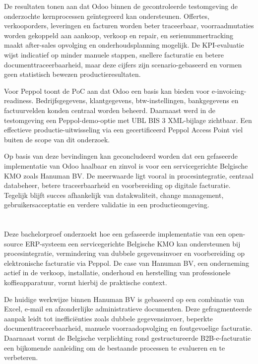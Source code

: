 {De resultaten tonen aan dat Odoo binnen de gecontroleerde testomgeving de onderzochte kernprocessen geïntegreerd kan ondersteunen. Offertes, verkooporders, leveringen en facturen worden beter traceerbaar, voorraadmutaties worden gekoppeld aan aankoop, verkoop en repair, en serienummertracking maakt after-sales opvolging en onderhoudsplanning mogelijk. De KPI-evaluatie wijst indicatief op minder manuele stappen, snellere facturatie en betere documenttraceerbaarheid, maar deze cijfers zijn scenario-gebaseerd en vormen geen statistisch bewezen productieresultaten.

Voor Peppol toont de PoC aan dat Odoo een basis kan bieden voor e-invoicing-readiness. Bedrijfsgegevens, klantgegevens, btw-instellingen, bankgegevens en factuurvelden konden centraal worden beheerd. Daarnaast werd in de testomgeving een Peppol-demo-optie met UBL BIS 3 XML-bijlage zichtbaar. Een effectieve productie-uitwisseling via een gecertificeerd Peppol Access Point viel buiten de scope van dit onderzoek.

Op basis van deze bevindingen kan geconcludeerd worden dat een gefaseerde implementatie van Odoo haalbaar en zinvol is voor een servicegerichte Belgische KMO zoals Hanuman BV. De meerwaarde ligt vooral in procesintegratie, centraal databeheer, betere traceerbaarheid en voorbereiding op digitale facturatie. Tegelijk blijft succes afhankelijk van datakwaliteit, change management, gebruikersacceptatie en verdere validatie in een productieomgeving.

}{}


\chapter*{}

Deze bachelorproef onderzoekt hoe een gefaseerde implementatie van een open-source ERP-systeem een servicegerichte Belgische KMO kan ondersteunen bij procesintegratie, vermindering van dubbele gegevensinvoer en voorbereiding op elektronische facturatie via Peppol. De case van Hanuman BV, een onderneming actief in de verkoop, installatie, onderhoud en herstelling van professionele koffieapparatuur, vormt hierbij de praktische context.

De huidige werkwijze binnen Hanuman BV is gebaseerd op een combinatie van Excel, e-mail en afzonderlijke administratieve documenten. Deze gefragmenteerde aanpak leidt tot inefficiënties zoals dubbele gegevensinvoer, beperkte documenttraceerbaarheid, manuele voorraadopvolging en foutgevoelige facturatie. Daarnaast vormt de Belgische verplichting rond gestructureerde B2B-e-facturatie een bijkomende aanleiding om de bestaande processen te evalueren en te verbeteren.

